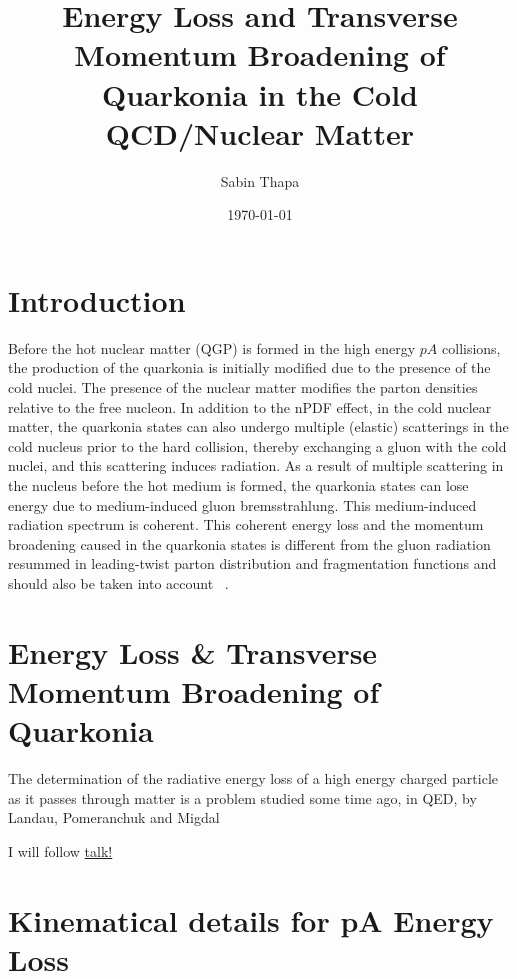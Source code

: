 \documentclass[11pt,onecolumn]{article}
\title{Energy Loss and Transverse Momentum Broadening of Quarkonia in the Cold QCD/Nuclear Matter}
\author{Sabin Thapa}
\date{\today}
\begin{document}
\maketitle
\section{Introduction}
Before the hot nuclear matter (QGP) is formed in the high energy $pA$ collisions, the production of the quarkonia is initially modified due to the presence of the cold nuclei. The presence of the nuclear matter modifies the parton densities relative to the free nucleon. In addition to the nPDF effect, in the cold nuclear matter, the quarkonia states can also undergo multiple (elastic) scatterings in the cold nucleus prior to the hard collision, thereby exchanging a gluon with the cold nuclei, and this scattering induces radiation. As a result of multiple scattering in the nucleus before the hot medium is formed, the quarkonia states can lose energy due to medium-induced gluon bremsstrahlung. This medium-induced radiation spectrum is coherent. This coherent energy loss and the momentum broadening caused in the quarkonia states is different from the gluon radiation resummed in leading-twist parton distribution and fragmentation functions and should also be taken into account ~\cite{Arleo:2012rs,Liou:2014rha}.


\section{Energy Loss \& Transverse Momentum Broadening of Quarkonia}
The determination of the radiative energy loss of a high energy charged particle as it passes through matter is a problem studied some time ago, in QED, by Landau, Pomeranchuk and Migdal \cite{Baier:1996kr, Vitev:2007ve}



I will follow \href{https://indico.cern.ch/event/327279/contributions/761838/attachments/1133255/1620606/arleo_vietnam.pdf}{talk!}










\section{Kinematical details for pA Energy Loss}
\end{document}
